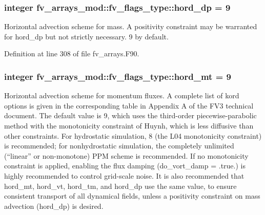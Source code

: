 \subsubsection[{hord\-\_\-dp}]{\setlength{\rightskip}{0pt plus 5cm}integer fv\-\_\-arrays\-\_\-mod\-::fv\-\_\-flags\-\_\-type\-::hord\-\_\-dp = 9}\label{structfv__arrays__mod_1_1fv__flags__type_a65a2e3ed85e51cb3b2245e3f36bf8391}


Horizontal advection scheme for mass. A positivity constraint may be warranted for hord\-\_\-dp but not strictly necessary. 9 by default. 



Definition at line 308 of file fv\-\_\-arrays.\-F90.

\subsubsection[{hord\-\_\-mt}]{\setlength{\rightskip}{0pt plus 5cm}integer fv\-\_\-arrays\-\_\-mod\-::fv\-\_\-flags\-\_\-type\-::hord\-\_\-mt = 9}\label{structfv__arrays__mod_1_1fv__flags__type_ab166cc8b6c93e0c863180aeb50b5aea9}


Horizontal advection scheme for momentum fluxes. A complete list of kord options is given in the corresponding table in Appendix A of the F\-V3 technical document. The default value is 9, which uses the third-\/order piecewise-\/parabolic method with the monotonicity constraint of Huynh, which is less diffusive than other constraints. For hydrostatic simulation, 8 (the L04 monotonicity constraint) is recommended; for nonhydrostatic simulation, the completely unlimited (“linear” or non-\/monotone) P\-P\-M scheme is recommended. If no monotonicity constraint is applied, enabling the flux damping (do\-\_\-vort\-\_\-damp = .true.) is highly recommended to control grid-\/scale noise. It is also recommended that hord\-\_\-mt, hord\-\_\-vt, hord\-\_\-tm, and hord\-\_\-dp use the same value, to ensure consistent transport of all dynamical fields, unless a positivity constraint on mass advection (hord\-\_\-dp) is desired. 



